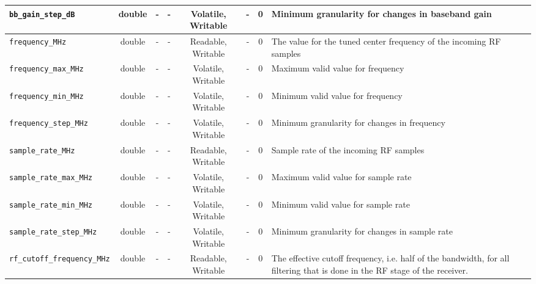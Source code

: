 \documentclass{article}
\begin{document}
\begin{landscape}
\begin{scriptsize}
\begin{tabular}{|p{4cm}|c|c|c|c|c|c|p{8cm}|}
			\hline
			\verb+bb_gain_step_dB+              & double & -        & -          & Volatile, Writable & -           & 0       & Minimum granularity for changes in baseband gain                                           \\
			\hline
			\verb+frequency_MHz+                & double & -        & -          & Readable, Writable  & -           & 0       & The value for the tuned center frequency of the incoming RF samples                        \\
			\hline
			\verb+frequency_max_MHz+            & double & -        & -          & Volatile, Writable & -           & 0       & Maximum valid value for frequency                                                          \\
			\hline
			\verb+frequency_min_MHz+            & double & -        & -          & Volatile, Writable & -           & 0       & Minimum valid value for frequency                                                          \\
			\hline
			\verb+frequency_step_MHz+           & double & -        & -          & Volatile, Writable & -           & 0       & Minimum granularity for changes in frequency                                               \\
			\hline
			\verb+sample_rate_MHz+              & double & -        & -          & Readable, Writable  & -           & 0       & Sample rate of the incoming RF samples                                                     \\
			\hline
			\verb+sample_rate_max_MHz+          & double & -        & -          & Volatile, Writable & -           & 0       & Maximum valid value for sample rate                                                        \\
			\hline
			\verb+sample_rate_min_MHz+          & double & -        & -          & Volatile, Writable & -           & 0       & Minimum valid value for sample rate                                                        \\
			\hline
			\verb+sample_rate_step_MHz+         & double & -        & -          & Volatile, Writable & -           & 0       & Minimum granularity for changes in sample rate                                             \\
			\hline
			\verb+rf_cutoff_frequency_MHz+      & double & -        & -          & Readable, Writable  & -           & 0       & The effective cutoff frequency, i.e. half of the bandwidth, for all filtering that is done in the RF stage of the receiver.      \\

\end{tabular}
\end{scriptsize}
\end{landscape}
\end{document}
